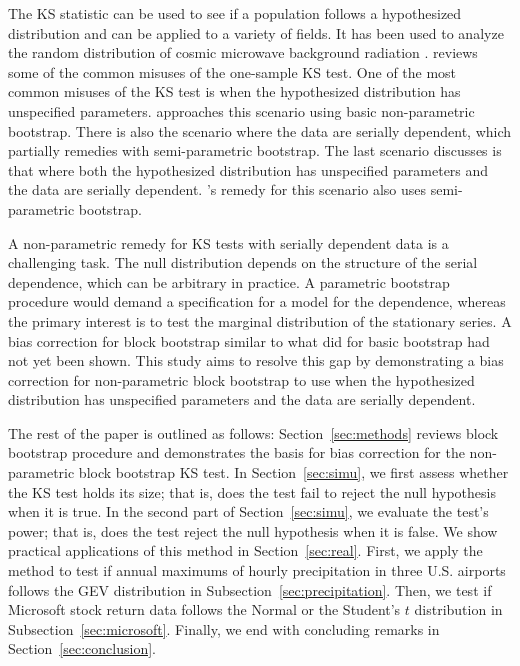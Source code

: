 \documentclass[12pt, titlepage, letterpaper]{article}
\begin{document}
{The KS statistic 
can be used to see if a population follows a hypothesized distribution and can 
be applied to a variety of fields. It has
been used to analyze the random distribution of cosmic microwave background 
radiation \citep{naess2012application}. \citet{zeimbekakis2022misuses} reviews
some of the common misuses of the one-sample KS test. One of the most common 
misuses of the KS test is when
the hypothesized distribution has unspecified parameters. 
\citet{babu2004goodness} approaches this scenario using basic 
non-parametric bootstrap. There is also the scenario where the data are serially
dependent, which \citet{zeimbekakis2022misuses} partially remedies with 
semi-parametric
bootstrap. The last scenario \citet{zeimbekakis2022misuses} discusses is that
where both the hypothesized 
distribution has unspecified parameters and the data are 
serially dependent. \citet{zeimbekakis2022misuses}'s remedy for
this scenario also uses semi-parametric bootstrap.


A non-parametric remedy for KS tests with serially dependent data is
a challenging task. The null distribution depends on the structure of the serial
dependence, which can be arbitrary in practice. A parametric bootstrap procedure
would demand a specification for a model for the dependence, whereas the primary 
interest
is to test the marginal distribution of the stationary series. A bias 
correction
for block bootstrap similar to what \citet{babu2004goodness} did for basic
bootstrap had not yet been shown.  This study aims to resolve this gap by 
demonstrating a bias 
correction
for non-parametric block bootstrap to use when the hypothesized distribution
has unspecified parameters and the data are serially dependent.


The rest of the paper is outlined as follows: Section~\ref{sec:methods} reviews
block bootstrap procedure and demonstrates the basis for bias correction for
the non-parametric block bootstrap KS test. In Section~\ref{sec:simu}, we first 
assess whether the KS
test holds its size; that is, does the test fail to reject the null hypothesis
when it is true. In the second part of Section~\ref{sec:simu}, we 
evaluate the 
test's power; that is, does the test reject the null hypothesis when it is 
false. We show practical applications of this method in Section~\ref{sec:real}.
First, we apply the method to test if annual maximums of hourly precipitation
in three U.S. airports follows the GEV distribution in 
Subsection~\ref{sec:precipitation}.
Then, we test if Microsoft stock return data follows the Normal or the Student's
$t$ distribution in Subsection~\ref{sec:microsoft}.
Finally, we end with 
concluding remarks in Section~\ref{sec:conclusion}.


}
\end{document}

